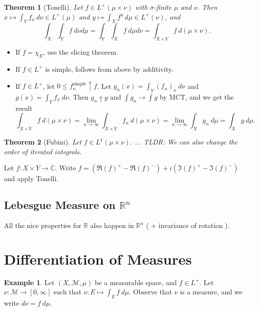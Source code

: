 \documentclass[11pt]{article}
\newtheorem{thm}{Theorem}[section]
\theoremstyle{definition}
\newtheorem{example}{Example}[section]
\newcommand{\RR}{\mathbb{R}}
\newcommand{\CC}{\mathbb{C}}
\newcommand{\m}[1]{\mathcal{#1}}
\begin{document}
\begin{thm}[Tonelli]
Let $f\in L^+(\mu\times\nu)$ with $\sigma$-finite $\mu$ and $\nu$. Then
$x\mapsto\int_Yf_x~d\nu\in L^+(\mu)$ and $y\mapsto\int_Xf^y~d\mu\in L^+(\nu)$, and
\[
  \int_X\int_Yf~d\nu d\mu = \int_Y\int_Xf~d\mu d\nu = \int_{X\times Y}f~d(\mu\times\nu) . 
\]
\end{thm}
\proof
  \begin{itemize}
    \item If $f=\chi_E$, use the slicing theorem. 
    \item If $f\in L^+$ is simple, follows from above by additivity.
    \item If $f\in L^+$, let $0\le f_n^\text{simple}\uparrow f$. Let
    $g_n(x)=\int_Y(f_n)_x~d\nu$ and $g(x)=\int_Yf_x~d\nu$. Then $g_n\uparrow g$ and $\int
    g_n \to \int g$ by MCT, and we get the result
    \[
      \int_{X\times Y}f~d(\mu\times\nu) = \lim_{n\to\infty}\int_{X\times
      Y}f_n~d(\mu\times\nu) = \lim_{n\to\infty}\int_Xg_n~d\mu = \int_Xg~d\mu .
    \]
  \end{itemize}
\qedhere

\begin{thm}[Fubini]
  Let $f\in L^1(\mu\times\nu)$. ... TLDR: We can also change the order of iterated integrals. 
\end{thm}
\proof
  Let $f:X\times Y\to\CC$. Write $f=(\Re(f)^+-\Re(f)^-)+i(\Im(f)^+-\Im(f)^-)$ and apply
  Tonelli. 
\qedhere

\subsection{Lebesgue Measure on $\RR^n$}
All the nice properties for $\RR$ also happen in $\RR^n$ ( + invariance of rotation ). 







\section{Differentiation of Measures}

\begin{example}
  Let $(X,\m{M},\mu)$ be a measurable space, and $f\in L^+$. Let $\nu:\m{M}\to[0,\infty]$
  such that $\nu:E\mapsto\int_Ef~d\mu$. Observe that $\nu$ is a measure, and we write
  $d\nu=f~d\mu$. 
\end{example}
\end{document}
